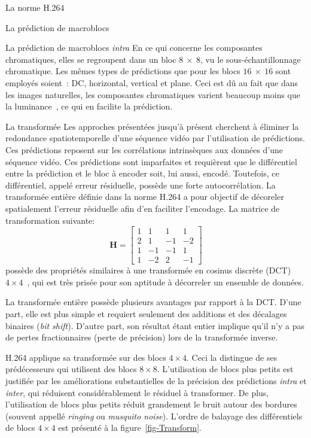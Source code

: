 \begin{chapter}{La norme H.264}
\begin{section}{La prédiction de macroblocs}
\begin{subsection}{La prédiction de macroblocs \textit{intra}}
En ce qui concerne les composantes chromatiques, elles se regroupent dans un
bloc $8~\times~8$, vu le sous-échantillonnage chromatique. Les mêmes types de
prédictions que pour les blocs $16~\times~16$ sont employés soient~: DC,
horizontal, vertical et plane. Ceci est dû au fait que dans les images
naturelles, les composantes chromatiques varient beaucoup moins que la
luminance~\citep{Wang2001}, ce qui en facilite la prédiction.
\end{subsection}
\end{section}


\begin{section}{La transformée}
\newcommand{\ltH}{\mathbf{H}}
Les approches présentées jusqu'à présent cherchent à éliminer la redondance
spatiotemporelle d'une séquence vidéo par l'utilisation de prédictions. Ces
prédictions reposent sur les corrélations intrinsèques aux données d'une
séquence vidéo. Ces prédictions sont imparfaites et requièrent que le
différentiel entre la prédiction et le bloc à encoder soit, lui aussi, encodé.
Toutefois, ce différentiel, appelé erreur résiduelle, possède une forte
autocorrélation. La transformée entière définie dans la norme H.264 a pour
objectif de décoreler spatialement l'erreur résiduelle afin d'en faciliter
l'encodage. La matrice de transformation suivante:
\begin{equation}
\ltH = \begin {bmatrix}
1 & 1 & 1 & 1\\
2 & 1 & -1 & -2\\
1 & -1 & -1 & 1\\
1 & -2 & 2 & -1
\end{bmatrix}
\end{equation}
possède des propriétés similaires à une transformée en cosinus discrète
(DCT) $4 \times 4$~\citep{malvar2003}, qui est très prisée pour son aptitude
à décorreler un ensemble de données.

La transformée entière possède plusieurs avantages par rapport à la DCT.
D'une part, elle est plus simple et requiert seulement des additions et
des décalages binaires (\textit{bit shift}). D'autre part, son résultat étant
entier implique qu'il n'y a pas de pertes fractionnaires (perte de précision)
lors de la transformée inverse.

H.264 applique sa transformée sur des blocs $4 \times 4$. Ceci la distingue de
ses prédécesseurs qui utilisent des blocs $8 \times 8$. L'utilisation de blocs
plus petits est justifiée par les améliorations substantielles de la  précision
des prédictions \textit{intra} et \textit{inter}, qui réduisent considérablement
le résiduel à transformer. De plus, l'utilisation de blocs plus petits réduit
grandement le bruit autour des bordures (souvent appellé \textit{ringing} ou
\textit{musquito noise}). L'ordre de balayage des différentiels de blocs $4
\times 4$ est présenté à la figure~\ref{fig-Transform}.


\end{section}
\end{chapter}
